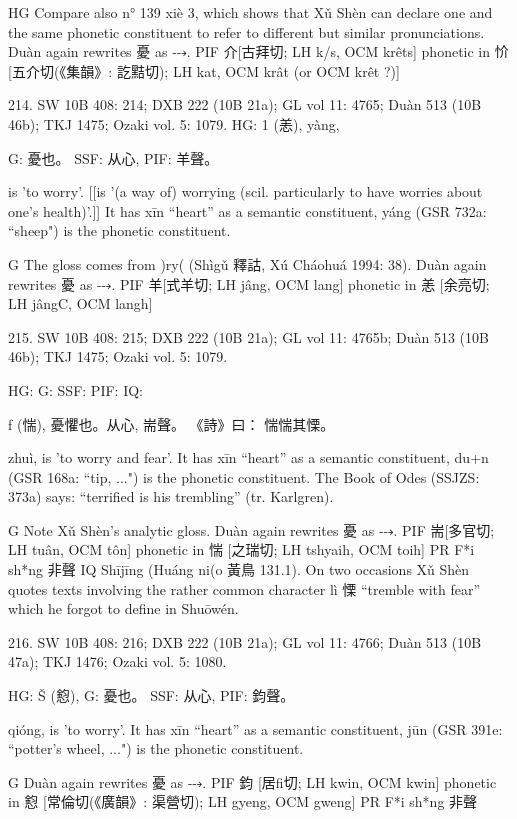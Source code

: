 {HG Compare also n° 139 xiè 3, which shows that Xǔ Shèn can declare one and the same phonetic constituent to refer to different but similar pronunciations.
Duàn again rewrites 憂 as ⤏.
PIF     介[古拜切; LH k/s, OCM krêts] phonetic in 忦 [五介切(《集韻》: 訖黠切); LH kat, OCM krât (or OCM krêt ?)]


214. SW 10B 408: 214; DXB 222 (10B 21a); GL vol 11: 4765; Duàn 513 (10B 46b); TKJ 1475; Ozaki vol. 5: 1079.
HG: 1 (恙), yàng,

G:	憂也。
SSF: 从心,
PIF: 羊聲。

is 'to worry'. [[is '(a way of) worrying (scil. particularly to have worries about one's health)'.]]
It has xīn ``heart'' as a semantic constituent,
yáng (GSR 732a: ``sheep") is the phonetic constituent.

G	The gloss comes from )ry( (Shìgǔ 釋詁, Xú Cháohuá 1994: 38).
Duàn again rewrites 憂 as ⤏.
PIF     羊[式羊切; LH jâng, OCM lang] phonetic in 恙 [余亮切; LH jângC, OCM langh]

215. SW 10B 408: 215; DXB 222 (10B 21a); GL vol 11: 4765b; Duàn 513 (10B 46b); TKJ 1475; Ozaki vol. 5: 1079.


HG:
G: SSF: PIF: IQ:

f (惴), 憂懼也。从心,
耑聲。
《詩》曰： 惴惴其慄。


zhuì,
is 'to worry and fear'.
It has xīn ``heart'' as a semantic constituent,
du+n (GSR 168a: ``tip, ...") is the phonetic constituent.
The Book of Odes (SSJZS: 373a) says: ``terrified is his trembling'' (tr. Karlgren).

G	Note Xǔ Shèn's analytic gloss. Duàn again rewrites 憂 as ⤏.
PIF     耑[多官切; LH tuân, OCM tôn] phonetic in 惴 [之瑞切; LH tshyaih, OCM toih]
PR	F*i sh*ng 非聲
IQ	Shījīng (Huáng ni(o 黃鳥 131.1). On two occasions Xǔ Shèn quotes texts involving the rather common character lì 慄 ``tremble with fear'' which he forgot to define in Shuōwén.



216. SW 10B 408: 216; DXB 222 (10B 21a); GL vol 11: 4766; Duàn 513 (10B 47a); TKJ 1476; Ozaki vol. 5: 1080.

HG: Š (憌),
G:	憂也。
SSF: 从心,
PIF: 鈞聲。


qióng,
is 'to worry'.
It has xīn ``heart'' as a semantic constituent,
jūn (GSR 391e: ``potter's wheel, ...") is the phonetic constituent.

G	Duàn again rewrites 憂 as ⤏.
PIF     鈞 [居fi切; LH kwin, OCM kwin] phonetic in 憌 [常倫切(《廣韻》: 渠營切); LH gyeng, OCM gweng]
PR	F*i sh*ng 非聲

}
